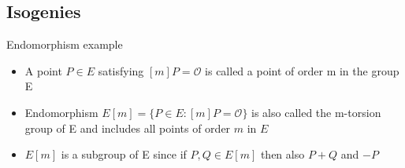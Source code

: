 \documentclass[handout]{beamer}
\begin{document}
\subsection{Isogenies}
%	 
%	
%		
%		
%
\begin{frame}{Endomorphism example}
\begin{itemize}[\textbullet]
	\item A point $P\in E$ satisfying $[m]P=\mathcal{O}$ is called a point of order m in the group E\pause
	\item Endomorphism $E[m] = \{P\in E: [m]P = \mathcal{O}\}$ is also called the m-torsion group of E and includes all points of order $m$ in $E$\pause
	\item $E[m] $ is a subgroup of E since if $P,Q\in E[m]$ then also $P+Q$ and $-P$
\end{itemize}	

\end{frame}
\end{document}
